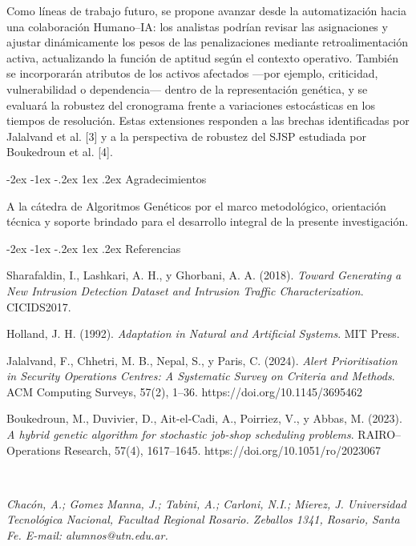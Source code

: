 \documentclass[12pt,a4paper,twocolumn]{article}
\makeatletter
\renewcommand{\section}{\@startsection{section}{1}{\z@}%
  {-2ex \@plus -1ex \@minus -.2ex}%
  {1ex \@plus.2ex}%
  {\fontsize{12}{14}\selectfont\bfseries}}
\makeatother
\begin{document}
Como líneas de trabajo futuro, se propone avanzar desde la automatización hacia una colaboración Humano--IA: los analistas podrían revisar las asignaciones y ajustar dinámicamente los pesos de las penalizaciones mediante retroalimentación activa, actualizando la función de aptitud según el contexto operativo. También se incorporarán atributos de los activos afectados ---por ejemplo, criticidad, vulnerabilidad o dependencia--- dentro de la representación genética, y se evaluará la robustez del cronograma frente a variaciones estocásticas en los tiempos de resolución. Estas extensiones responden a las brechas identificadas por Jalalvand et al. [3] y a la perspectiva de robustez del SJSP estudiada por Boukedroun et al. [4].

\section{Agradecimientos}
{\fontsize{10}{12}\selectfont
A la cátedra de Algoritmos Genéticos por el marco metodológico, orientación técnica y soporte brindado para el desarrollo integral de la presente investigación.
\par}

\section{Referencias}
{\fontsize{10}{12}\selectfont
\noindent [1] Sharafaldin, I., Lashkari, A. H., y Ghorbani, A. A. (2018). \textit{Toward Generating a New Intrusion Detection Dataset and Intrusion Traffic Characterization}. CICIDS2017.

\noindent [2] Holland, J. H. (1992). \textit{Adaptation in Natural and Artificial Systems}. MIT Press.

\noindent [3] Jalalvand, F., Chhetri, M. B., Nepal, S., y Paris, C. (2024). \textit{Alert Prioritisation in Security Operations Centres: A Systematic Survey on Criteria and Methods}. ACM Computing Surveys, 57(2), 1--36. https://doi.org/10.1145/3695462

\noindent [4] Boukedroun, M., Duvivier, D., Ait-el-Cadi, A., Poirriez, V., y Abbas, M. (2023). \textit{A hybrid genetic algorithm for stochastic job-shop scheduling problems}. RAIRO--Operations Research, 57(4), 1617--1645. https://doi.org/10.1051/ro/2023067
\par}

\vspace{1.5em}

\\
{\fontsize{10}{12}\selectfont\itshape 
Chacón, A.; Gomez Manna, J.; Tabini, A.; Carloni, N.I.; Mierez, J. Universidad Tecnológica Nacional, Facultad Regional Rosario. Zeballos 1341, Rosario, Santa Fe. E-mail: alumnos@utn.edu.ar.
\par}
\end{document}
